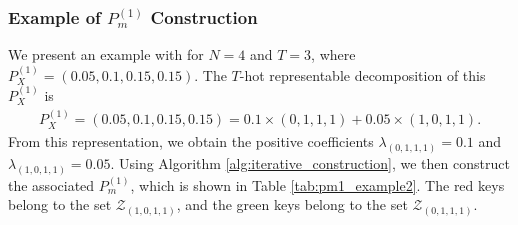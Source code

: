 \documentclass[11pt,letterpaper]{article}
\newcommand{\cZ}{\mathcal{Z}}
\begin{document}
\subsubsection{Example of $P_m^{(1)}$ Construction}


We present an example with for $N=4$ and $T=3$, where $P_X^{(1)} = (0.05, 0.1, 0.15, 0.15)$. The $T$-hot representable decomposition of this $P_X^{(1)}$ is
\begin{align}
    P_X^{(1)} = (0.05, 0.1, 0.15, 0.15) 
    = 0.1 \times (0,1,1,1) + 0.05 \times (1,0,1,1).
\end{align}
From this representation, we obtain the positive coefficients $\lambda_{(0,1,1,1)} = 0.1$ and $\lambda_{(1,0,1,1)} = 0.05$. Using Algorithm \ref{alg:iterative_construction}, we then construct the associated $P_m^{(1)}$, which is shown in Table \ref{tab:pm1_example2}. The red keys belong to the set $\cZ_{(1,0,1,1)}$, and the green keys belong to the set $\cZ_{(0,1,1,1)}$.
\end{document}
